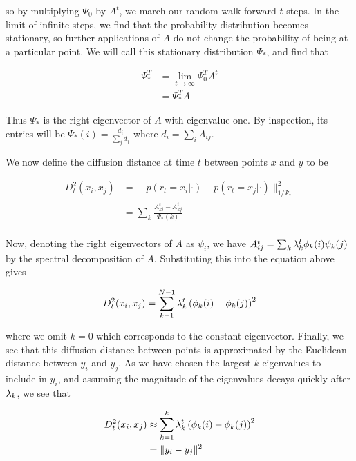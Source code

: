 so by multiplying $\Psi_0$ by $A^t$, we march our random walk forward
$t$ steps. In the limit of infinite steps, we find that the
probability distribution becomes stationary, so further applications
of $A$ do not change the probability of being at a particular
point. We will call this stationary distribution $\Psi_*$, and find
that

\begin{align}
  \Psi_*^T &= \lim_{t \rightarrow \infty} \Psi_0^T A^t \\
           &= \Psi_*^T A
\end{align}

Thus $\Psi_*$ is the right eigenvector of $A$ with eigenvalue one. By
inspection, its entries will be $\Psi_*(i) = \frac{d_i}{\sum_j d_j}$
where $d_i = \sum_i A_{ij}$.

We now define the diffusion distance at time $t$ between points $x$
and $y$ to be

\begin{align}
  D^2_t(x_i, x_j) &= \| p(r_t = x_i| \cdot) - p(r_t = x_j | \cdot) \|^2_{1/\Psi_*} \\
                  &= \sum_k \frac{A^t_{ki} - A^t_{kj}}{\Psi_*(k)} \\
\end{align}

Now, denoting the right eigenvectors of $A$ as $\psi_i$, we have
$A^t_{ij} = \sum_k \lambda_k^t \phi_k(i) \psi_k(j)$ by the spectral
decomposition of $A$. Substituting this into the equation above gives

\begin{align}
  D^2_t(x_i, x_j) &= \sum_{k=1}^{N-1} \lambda_k^t \left( \phi_k(i) -
                    \phi_k(j) \right)^2 \\
\end{align}

where we omit $k=0$ which corresponds to the constant
eigenvector. Finally, we see that this diffusion distance between
points is approximated by the Euclidean distance between $y_i$ and
$y_j$. As we have chosen the largest $k$ eigenvalues to include in
$y_i$, and assuming the magnitude of the eigenvalues decays quickly
after $\lambda_k$, we see that

\begin{align}
  D^2_t(x_i, x_j) & \approx \sum_{k=1}^{k} \lambda_k^t \left( \phi_k(i) -
                    \phi_k(j) \right)^2 \\
  & = \| y_i - y_j \|^2
\end{align}

